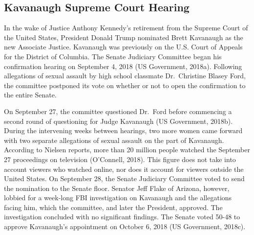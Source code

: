 \documentclass[english,,man]{apa6}
\begin{document}
\hypertarget{kavanaugh-supreme-court-hearing}{%
\subsection{Kavanaugh Supreme Court Hearing}\label{kavanaugh-supreme-court-hearing}}

In the wake of Justice Anthony Kennedy's retirement from the Supreme Court of the United States, President Donald Trump nominated Brett Kavanaugh as the new Associate Justice. Kavanaugh was previously on the U.S. Court of Appeals for the District of Columbia. The Senate Judiciary Committee began his confirmation hearing on September 4, 2018 (US Government, 2018a). Following allegations of sexual assault by high school classmate Dr.~Christine Blasey Ford, the committee postponed its vote on whether or not to open the confirmation to the entire Senate.

On September 27, the committee questioned Dr.~Ford before commencing a second round of questioning for Judge Kavanaugh (US Government, 2018b). During the intervening weeks between hearings, two more women came forward with two separate allegations of sexual assault on the part of Kavanaugh. According to Nielsen reports, more than 20 million people watched the September 27 proceedings on television (O'Connell, 2018). This figure does not take into account viewers who watched online, nor does it account for viewers outside the United States. On September 28, the Senate Judiciary Committee voted to send the nomination to the Senate floor. Senator Jeff Flake of Arizona, however, lobbied for a week-long FBI investigation on Kavanaugh and the allegations facing him, which the committee, and later the President, approved. The investigation concluded with no significant findings. The Senate voted 50-48 to approve Kavanaugh's appointment on October 6, 2018 (US Government, 2018c).
\end{document}
